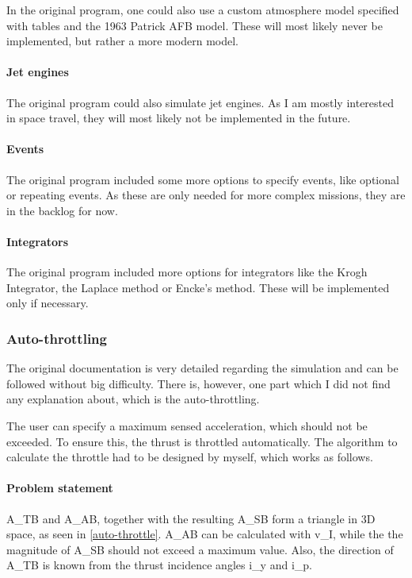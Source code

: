 In the original program, one could also use a custom atmosphere model
specified with tables and the 1963 Patrick AFB model. These will most likely
never be implemented, but rather a more modern model.

\paragraph{Jet engines}

The original program could also simulate jet engines. As I am mostly
interested in space travel, they will most likely not be implemented in the
future.

\paragraph{Events}

The original program included some more options to specify events, like
optional or repeating events. As these are only needed for more complex
missions, they are in the backlog for now.

\paragraph{Integrators}

The original program included more options for integrators like the Krogh
Integrator, the Laplace method or Encke's method. These will be implemented
only if necessary.

\subsubsection{Auto-throttling}\label{auto-throttling}

The original documentation is very detailed regarding the simulation and can
be followed without big difficulty. There is, however, one part which I did
not find any explanation about, which is the auto-throttling.

The user can specify a maximum sensed acceleration, which should not be
exceeded. To ensure this, the thrust is throttled automatically. The algorithm
to calculate the throttle had to be designed by myself, which works as
follows.

\paragraph{Problem statement}

\gls{A_TB} and \gls{A_AB}, together with the resulting \gls{A_SB} form a triangle in 3D space, as seen in \cref{auto-throttle}. \gls{A_AB} can be calculated with \gls{v_I}, while the the magnitude of \gls{A_SB} should not exceed a maximum value. Also, the direction of \gls{A_TB} is known from the thrust incidence angles \gls{i_y} and \gls{i_p}.

